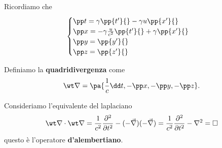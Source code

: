 Ricordiamo che
\[\begin{cases}
\pp t{}=\gamma\pp{t'}{}-\gamma u\pp{x'}{}\\
\pp x{}=-\gamma \frac{u}{c^2}\pp{t'}{}+\gamma \pp{x'}{}\\
\pp y{}=\pp {y'}{}\\
\pp z{}=\pp {z'}{}
\end{cases}\]

\begin{definition}[Quadrigradiente]
Definiamo la \textbf{quadridivergenza} come
\[\wt \nabla=\pa{\frac1c\dd t{},-\pp x{},-\pp y{},-\pp z{}}.\]
\end{definition}

\begin{remark}
Consideriamo l'equivalente del laplaciano
\[\wt \nabla\cdot\wt\nabla=\frac1{c^2}\pps[2]t{}-(-\vec\nabla)(-\vec \nabla)=\frac1{c^2}\pps[2]t{}-\nabla^2=\square\]
questo \`e l'operatore \textbf{d'alembertiano}.
\end{remark}

